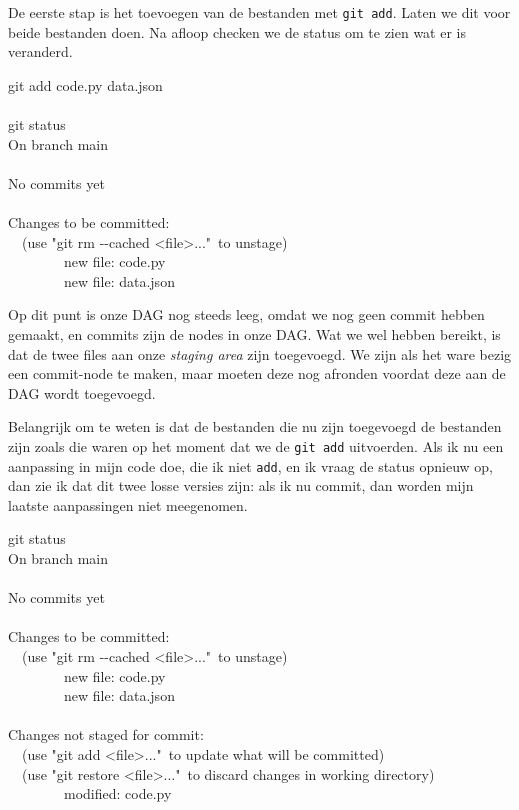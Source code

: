 De eerste stap is het toevoegen van de bestanden met \texttt{git add}. Laten we dit voor beide bestanden doen. Na afloop checken we de status om te zien wat er is veranderd.

\begin{bash}
 git add code.py data.json\\
~ \\
 git status\\
On branch main\\
~ \\
No commits yet\\
~ \\
Changes to be committed:\\
\ \ (use "git rm -\!-cached <file>..."\ to unstage)\\
\ \ \ \ \ \ \ \ {\color{ttgreen}new file:   code.py}\\
\ \ \ \ \ \ \ \ {\color{ttgreen}new file:   data.json}\\
\end{bash}

Op dit punt is onze DAG nog steeds leeg, omdat we nog geen commit hebben gemaakt, en commits zijn de nodes in onze DAG. Wat we wel hebben bereikt, is dat de twee files aan onze \emph{staging area} zijn toegevoegd. We zijn als het ware bezig een commit-node te maken, maar moeten deze nog afronden voordat deze aan de DAG wordt toegevoegd.

Belangrijk om te weten is dat de bestanden die nu zijn toegevoegd de bestanden zijn zoals die waren op het moment dat we de \texttt{git add} uitvoerden. Als ik nu een aanpassing in mijn code doe, die ik niet \texttt{add}, en ik vraag de status opnieuw op, dan zie ik dat dit twee losse versies zijn: als ik nu commit, dan worden mijn laatste aanpassingen niet meegenomen.

\begin{bash}
 git status\\
On branch main\\
~ \\
No commits yet\\
~ \\
Changes to be committed:\\
\ \ (use "git rm -\!-cached <file>..."\ to unstage)\\
\ \ \ \ \ \ \ \ {\color{ttgreen}new file:   code.py}\\
\ \ \ \ \ \ \ \ {\color{ttgreen}new file:   data.json}\\
~ \\
Changes not staged for commit:\\
\ \ (use "git add <file>..."\ to update what will be committed)\\
\ \ (use "git restore <file>..."\ to discard changes in working directory)\\
\ \ \ \ \ \ \ \ {\color{ttred}modified:   code.py}\\
\end{bash}

